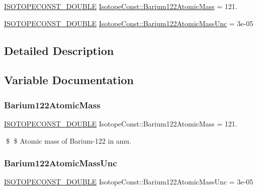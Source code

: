 \begin{DoxyCompactItemize}
\item 
\mbox{\hyperlink{group___isotope_const-_macros_ga8f45a7272ce02c0b4c65c44636ed719a}{I\+S\+O\+T\+O\+P\+E\+C\+O\+N\+S\+T\+\_\+\+D\+O\+U\+B\+LE}} \mbox{\hyperlink{group___isotope_const-_barium-_ba122_gaafd4b992f8726b1348f9bd7cd2c2923c}{Isotope\+Const\+::\+Barium122\+Atomic\+Mass}} = 121.
\item 
\mbox{\hyperlink{group___isotope_const-_macros_ga8f45a7272ce02c0b4c65c44636ed719a}{I\+S\+O\+T\+O\+P\+E\+C\+O\+N\+S\+T\+\_\+\+D\+O\+U\+B\+LE}} \mbox{\hyperlink{group___isotope_const-_barium-_ba122_gac3e14d831915bc142a26fab8bc995d7d}{Isotope\+Const\+::\+Barium122\+Atomic\+Mass\+Unc}} = 3e-\/05
\end{DoxyCompactItemize}


\subsection{Detailed Description}


\subsection{Variable Documentation}
\mbox{\label{group___isotope_const-_barium-_ba122_gaafd4b992f8726b1348f9bd7cd2c2923c}} 
\subsubsection{\texorpdfstring{Barium122\+Atomic\+Mass}{Barium122AtomicMass}}
{\footnotesize\ttfamily \mbox{\hyperlink{group___isotope_const-_macros_ga8f45a7272ce02c0b4c65c44636ed719a}{I\+S\+O\+T\+O\+P\+E\+C\+O\+N\+S\+T\+\_\+\+D\+O\+U\+B\+LE}} Isotope\+Const\+::\+Barium122\+Atomic\+Mass = 121.}

\$ \$ Atomic mass of Barium-\/122 in amu. \mbox{\label{group___isotope_const-_barium-_ba122_gac3e14d831915bc142a26fab8bc995d7d}} 
\subsubsection{\texorpdfstring{Barium122\+Atomic\+Mass\+Unc}{Barium122AtomicMassUnc}}
{\footnotesize\ttfamily \mbox{\hyperlink{group___isotope_const-_macros_ga8f45a7272ce02c0b4c65c44636ed719a}{I\+S\+O\+T\+O\+P\+E\+C\+O\+N\+S\+T\+\_\+\+D\+O\+U\+B\+LE}} Isotope\+Const\+::\+Barium122\+Atomic\+Mass\+Unc = 3e-\/05}

